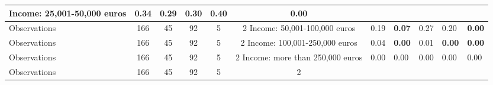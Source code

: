 \begin{tabular}{l c c c c c c }
Income: 25,001-50,000 euros &      0.34 &      0.29 &      0.30 &      0.40 & \textbf{     0.00} \\
\midrule
Observations &       166 &        45 &        92 &         5 &         2
Income: 50,001-100,000 euros &      0.19 & \textbf{     0.07} &      0.27 &      0.20 & \textbf{     0.00} \\
\midrule
Observations &       166 &        45 &        92 &         5 &         2
Income: 100,001-250,000 euros &      0.04 & \textbf{     0.00} &      0.01 & \textbf{     0.00} & \textbf{     0.00} \\
\midrule
Observations &       166 &        45 &        92 &         5 &         2
Income: more than 250,000 euros &      0.00 &      0.00 &      0.00 &      0.00 &      0.00 \\
\midrule
Observations &       166 &        45 &        92 &         5 &         2
\bottomrule
\end{tabular}
